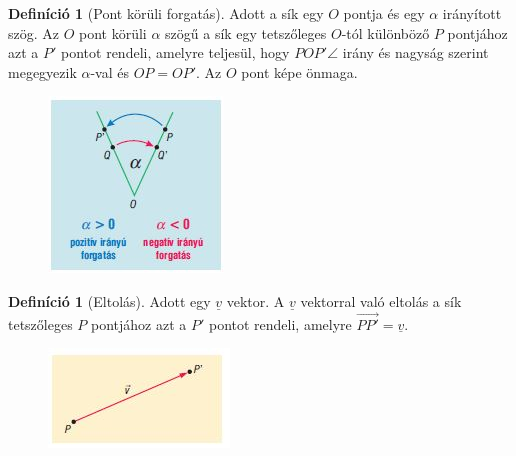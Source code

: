 \documentclass[twoside,12pt]{report}
\renewcommand{\vec}{\underline}
\theoremstyle{definition}
\newtheorem{definition}[theorem]{Definíció}
\begin{document}
	\begin{definition}[Pont körüli forgatás]
		Adott a sík egy $O$ pontja és egy $\alpha$ irányított szög. Az $O$ pont körüli $\alpha$ szögű a sík egy tetszőleges $O$-tól különböző $P$ pontjához azt a $P'$ pontot rendeli, amelyre teljesül, hogy $POP'\angle$ irány és nagyság szerint megegyezik $\alpha$-val és $OP = OP'$. Az $O$ pont képe önmaga.
	\end{definition}
	\begin{figure}[H]
		\centering
		\includegraphics[width=0.3\linewidth]{Forg}
	\end{figure}
	\begin{definition}[Eltolás]
		Adott egy $\vec{v}$ vektor. A $\vec{v}$ vektorral való eltolás a sík tetszőleges $P$ pontjához azt a $P'$ pontot rendeli, amelyre $\overrightarrow{PP'}=\vec{v}$.
	\end{definition}
	\begin{figure}[H]
		\centering
		\includegraphics[width=0.3\linewidth]{Elt}
	\end{figure}
\end{document}
